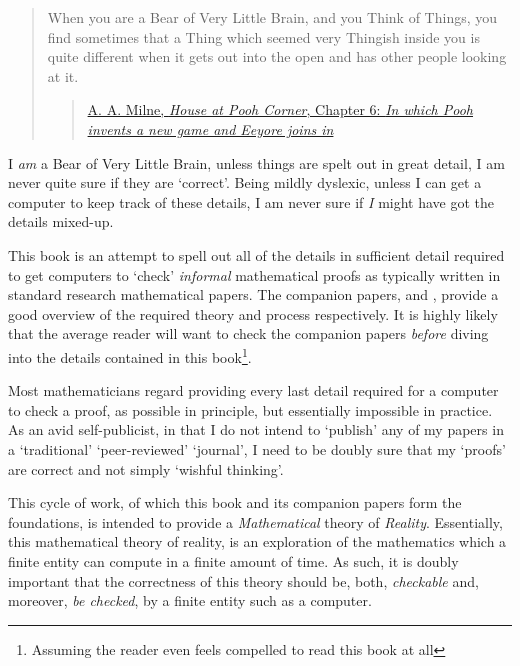\documentclass[a4paper,openany]{amsbook}
\begin{document}
\vspace{0.5cm}

\begin{quotation}
When you are a Bear of Very Little Brain, and you Think of Things, you find
sometimes that a Thing which seemed very Thingish inside you is quite different
when it gets out into the open and has other people looking at it.

\begin{quote}
\href{https://en.wikiquote.org/wiki/A._A._Milne#The_House_at_Pooh_Corner_.281928.29}{A. A. Milne,
\textit{House at Pooh Corner}, Chapter 6: \textit{In which Pooh invents a new
game and Eeyore joins in}}
\end{quote}
\end{quotation}

\vspace{0.5cm}

I \emph{am} a Bear of Very Little Brain, unless things are spelt out in great
detail, I am never quite sure if they are `correct'.  Being mildly dyslexic,
unless I can get a computer to keep track of these details, I am never sure if
\emph{I} might have got the details mixed-up.

This book is an attempt to spell out all of the details in sufficient detail
required to get computers to `check' \emph{informal} mathematical proofs as
typically written in standard research mathematical papers. The companion
papers, \cite{diSimplexTheory} and \cite{usingDiSimplexTheory}, provide a good
overview of the required theory and process respectively. It is highly likely
that the average reader will want to check the companion papers \emph{before}
diving into the details contained in this book\footnote{Assuming the reader even
feels compelled to read this book at all}.

Most mathematicians regard providing every last detail required for a computer
to check a proof, as possible in principle, but essentially impossible in
practice. As an avid self-publicist, in that I do not intend to `publish' any of
my papers in a `traditional' `peer-reviewed' `journal', I need to be doubly sure
that my `proofs' are correct and not simply `wishful thinking'.

This cycle of work, of which this book and its companion papers form the
foundations, is intended to provide a \emph{Mathematical} theory of
\emph{Reality}. Essentially, this mathematical theory of reality, is an
exploration of the mathematics which a finite entity can compute in a finite
amount of time. As such, it is doubly important that the correctness of this
theory should be, both, \emph{checkable} and, moreover, \emph{be checked}, by a
finite entity such as a computer.
\end{document}
